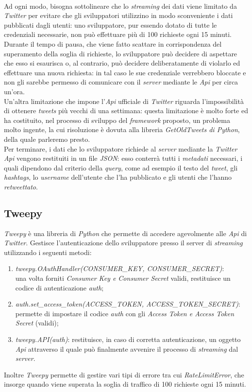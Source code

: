 \\Ad ogni modo, bisogna sottolineare che lo \textit{streaming} dei dati viene limitato da \textit{Twitter} per evitare che gli sviluppatori utilizzino in modo sconveniente i dati pubblicati dagli utenti: uno sviluppatore, pur essendo dotato di tutte le credenziali necessarie, non può effettuare più di 100 richieste ogni 15 minuti. Durante il tempo di pausa, che viene fatto scattare in corrispondenza del superamento della soglia di richieste, lo sviluppatore può decidere di aspettare che esso si esaurisca o, al contrario, può decidere deliberatamente di violarlo ed effettuare una nuova richiesta: in tal caso le sue credenziale verrebbero bloccate e non gli sarebbe permesso di comunicare con il \textit{server} mediante le \textit{Api} per circa un'ora.
\\Un'altra limitazione che impone l'\textit{Api} ufficiale di \textit{Twitter} riguarda l'impossibilità di ottenere \textit{tweets} più vecchi di una settimana: questa limitazione è molto forte ed ha costituito, nel processo di sviluppo del \textit{framework} proposto, un problema molto ingente, la cui risoluzione è dovuta alla libreria \textit{GetOldTweets di Python}, della quale parleremo presto.
\\Per terminare, i dati che lo sviluppatore richiede al \textit{server} mediante la \textit{Twitter Api} vengono restituiti in un file \textit{JSON}: esso conterrà tutti i \textit{metadati} necessari, i quali dipendono dal criterio della \textit{query}, come ad esempio il testo del \textit{tweet}, gli \textit{hashtags}, lo \textit{username} dell'utente che l'ha pubblicato e gli utenti che l'hanno \textit{retweettato}.

\subsection{Tweepy}
\textit{Tweepy} è una libreria di \textit{Python} che permette di accedere agevolmente alle \textit{Api} di \textit{Twitter}. Gestisce l'autenticazione dello sviluppatore presso il server di \textit{streaming} utilizzando i seguenti metodi:
\begin{enumerate}
\item \textit{tweepy.OAuthHandler(CONSUMER\_KEY, CONSUMER\_SECRET)}: 
\\una volta forniti \textit{Consumer Key e Consumer Secret} validi, restituisce un codice di autenticazione \textit{auth}; 
\item \textit{auth.set\_access\_token(ACCESS\_TOKEN, ACCESS\_TOKEN\_SECRET)}: 
\\permette di impostare il codice \textit{auth} con gli \textit{Access Token e Access Token Secret} (validi);
\item \textit{tweepy.API(auth)}: restituisce, in caso di corretta autenticazione, un oggetto \textit{Api} attraverso il quale può finalmente avvenire il processo di \textit{streaming} dal \textit{server}.
\end{enumerate}
Inoltre \textit{Tweepy} permette di gestire vari tipi di errore tra cui \textit{RateLimitError}, che insorge quando viene superata la soglia di traffico di 100 richieste ogni 15 minuti.

